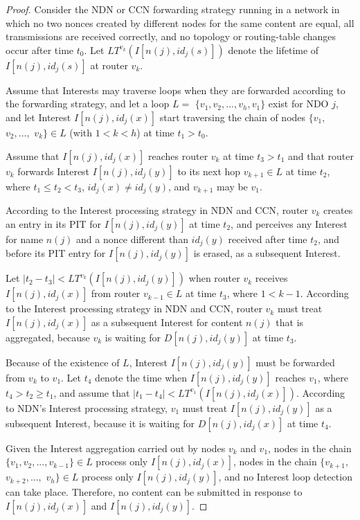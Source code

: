\documentclass{ancs15-alternate}
\begin{document}
\begin{proof}
Consider the NDN or CCN forwarding strategy running in a network in which 
no two nonces created by different nodes for the same content are equal, 
all transmissions are received correctly,  and no topology or routing-table changes occur after time $t_0$. 
Let $LT^{v_k}(I[n(j), id_j(s) ])$ denote the lifetime of $I[n(j), id_j(s) ]$ at router $v_k$. 

Assume that  Interests may traverse loops when they are forwarded according to the forwarding strategy, and
let a loop $L = $   $\{ v_1 , v_2 , ..., v_h , v_1 \}$  exist for NDO $j$, and let  Interest $I[n(j), id_j(x) ]$ start traversing the chain of nodes  
$\{v_1 ,$  $v_2 , ...,$ $v_k \}  \in L$  (with $1 < k < h$) at time $t_1 > t_0$.

Assume that $I[n(j), id_j(x) ]$ reaches router $v_k$ at time $t_3 > t_1$ and that router $v_k$ forwards Interest $I[n(j), id_j(y) ]$ to its next hop  $v_{k+1} \in L$ at time $t_2$, where $t_1 \leq t_2 < t_3$,  $id_j(x) \not= id_j(y)$, and $v_{k+1}$ may be $v_1$. 

According to the Interest processing strategy in NDN and CCN, router $v_k$ creates an entry in its PIT for $I[n(j), id_j(y) ]$ at time $t_2$, and perceives any Interest for name $n(j)$ and a  nonce different than $id_j(y)$ received after time $t_2$, and before its PIT entry 
for $I[n(j), id_j(y) ]$ is erased, as a subsequent Interest. 


Let $| t_2 -  t_3| < LT^{v_k}(I[n(j), id_j(y) ])$ when router $v_k$ receives $I[n(j), id_j(x) ]$ from router $v_{k - 1} \in L$  at time $t_3$, where $1 < k - 1$. 
According to the  Interest processing strategy in NDN and CCN, router $v_k$  must treat 
$I[n(j), id_j(x) ]$ as  a subsequent Interest for content $n(j)$ that is aggregated, 
because $v_k$ is waiting for $D[n(j), id_j(y) ]$ at time $t_3$.

Because of   the existence of $L$, Interest $I[n(j), id_j(y) ]$ must be forwarded from $v_k$ to $v_1$. Let $t_4$ denote the time when $I[n(j), id_j(y) ]$  reaches $v_1$, where 
$t_4 > t_2 \geq t_1$, and  assume that $| t_1 -  t_4| < LT^{v_1}(I[n(j), id_j(x) ])$. 
According to NDN's Interest processing strategy, $v_1$ must treat $I[n(j), id_j(y) ]$ as a subsequent Interest, because it is waiting for $D[n(j), id_j(x) ]$ at time $t_4$.

Given the Interest aggregation carried out by nodes $v_k$ and $v_1$,  nodes in the chain $\{ v_1 , v_2 , ..., v_{k - 1} \} \in L$ process only 
$I[n(j), id_j(x) ]$,  nodes in the chain $\{ v_{k + 1} , $ $v_{k + 2} , ...,$ $ v_{h} \} \in L$ process only $I[n(j), id_j(y) ]$, and no Interest loop detection can take place. 
Therefore,  no content can be submitted in response to $I[n(j), id_j(x) ]$ and $I[n(j), id_j(y) ]$.
\end{proof}
\end{document}

